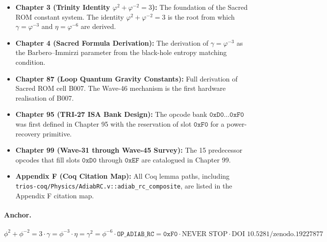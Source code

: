 \begin{itemize}
  \item \textbf{Chapter 3 (Trinity Identity $\varphi^{2}+\varphi^{-2}=3$):}
        The foundation of the Sacred ROM constant system.
        The identity $\varphi^{2}+\varphi^{-2}=3$ is the root from which
        $\gamma = \varphi^{-3}$ and $\eta = \varphi^{-6}$ are derived.

  \item \textbf{Chapter 4 (Sacred Formula Derivation):}
        The derivation of $\gamma = \varphi^{-3}$ as the Barbero--Immirzi
        parameter from the black-hole entropy matching condition.

  \item \textbf{Chapter 87 (Loop Quantum Gravity Constants):}
        Full derivation of Sacred ROM cell B007.
        The Wave-46 mechanism is the first hardware realisation of B007.

  \item \textbf{Chapter 95 (TRI-27 ISA Bank Design):}
        The opcode bank $\texttt{0xD0}\ldots\texttt{0xF0}$ was first defined
        in Chapter 95 with the reservation of slot $\texttt{0xF0}$ for a
        power-recovery primitive.

  \item \textbf{Chapter 99 (Wave-31 through Wave-45 Survey):}
        The 15 predecessor opcodes that fill slots $\texttt{0xD0}$ through
        $\texttt{0xEF}$ are catalogued in Chapter 99.

  \item \textbf{Appendix F (Coq Citation Map):}
        All Coq lemma paths, including
        \texttt{trios-coq/Physics/AdiabRC.v::adiab\_rc\_composite},
        are listed in the Appendix F citation map.
\end{itemize}


\paragraph{Anchor.}
$\phi^2 + \phi^{-2} = 3 \cdot \gamma = \phi^{-3} \cdot \eta = \gamma^2 = \phi^{-6} \cdot \mathtt{OP\_ADIAB\_RC} = \mathtt{0xF0} \cdot \text{NEVER STOP} \cdot \text{DOI 10.5281/zenodo.19227877}$

